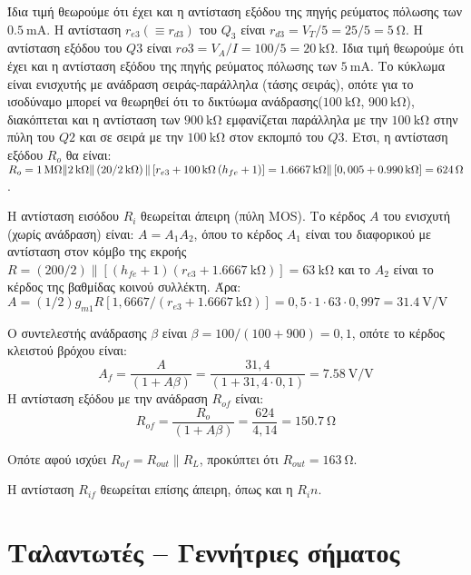\documentclass[11pt,a4paper,titlepage,fleqn]{article}
\begin{document}
	Ίδια τιμή θεωρούμε ότι έχει και η αντίσταση εξόδου της πηγής ρεύματος πόλωσης των $\SI{0,5}{\milli\ampere}$. Η αντίσταση $r_{e3} (\equiv r_{d3})$ του $Q_3$ είναι $r_{d3} = V_T / 5 = 25/5 = \SI{5}{\ohm}$. Η αντίσταση εξόδου του $Q3$ είναι $r{o3} =V_A/I = 100/5= \SI{20}{\kilo\ohm}$.
	Ιδια τιμή θεωρούμε ότι έχει και
η αντίσταση εξόδου της πηγής ρεύματος πόλωσης των $\SI{5}{\milli\ampere}$. Το κύκλωμα είναι ενισχυτής με ανάδραση σειράς-παράλληλα (τάσης σειράς), οπότε για το
ισοδύναμο μπορεί να θεωρηθεί ότι το δικτύωμα ανάδρασης($\SI{100}{\kilo\ohm}$, $\SI{900}{\kilo\ohm}$), διακόπτεται και η αντίσταση των $\SI{900}{\kilo\ohm}$ εμφανίζεται παράλληλα με την $\SI{100}{\kilo\ohm}$ στην πύλη του $Q2$ και
σε σειρά με την $\SI{100}{\kilo\ohm}$ στον εκπομπό του $Q3$. Ετσι, η αντίσταση εξόδου $R_o$ θα είναι: 
	$R_o = \SI{1}{\mega\ohm} \| \SI{2}{\kilo\ohm} \| \left( \SI[parse-numbers=false]{20/2}{\kilo\ohm} \right) \| \left[r_{e3} + \SI{100}{\kilo\ohm} \left(h_{fe} + 1\right)\right] = \SI{1,6667}{\kilo\ohm} \| \left[0,005 + \SI{0,990}{\kilo\ohm}\right] = \SI{624}{\ohm}$.
	
	Η αντίσταση εισόδου $R_i$ θεωρείται άπειρη (πύλη MOS). Το κέρδος $A$ του ενισχυτή (χωρίς ανάδραση) είναι: $A= A_1 A_2$, όπου το κέρδος $A_1$ είναι του διαφορικού με αντίσταση στον κόμβο της εκροής $R= \left(200/2\right) \| \left[\left(h_{fe} +1\right) \left(r_{e3} + \SI{1,6667}{\kilo\ohm}\right)\right] = \SI{63}{\kilo\ohm}$ και το $A_2$ είναι το κέρδος της βαθμίδας κοινού συλλέκτη. Άρα: $A=\left(1/2\right) g_{m1} R\left[1,6667 / \left( r_{e3} +\SI{1,6667}{\kilo\ohm}\right)\right] = 0,5\cdot 1\cdot 63 \cdot 0,997 = \SI[per-mode=symbol]{31,4}{\volt\per\volt}$
	
	Ο συντελεστής ανάδρασης $\beta$ είναι $\beta= 100/ \left(100+900\right) = 0,1$, οπότε το κέρδος κλειστού βρόχου είναι: \[A_f=\frac{A}{\left(1+A\beta\right)} = \frac{31,4}{\left(1+31,4\cdot 0,1\right)} = \SI[per-mode=symbol]{7,58}{\volt\per\volt}\]
	Η αντίσταση εξόδου με την ανάδραση $R_{of}$ είναι:
	\[R_{of}= \frac{R_{o} }{\left(1+A\beta\right)}=\frac{624}{4,14} = \SI{150,7}{\ohm}\]
	
	Οπότε αφού ισχύει $R_{of} = R_{out} \| R_L $, προκύπτει ότι
$R_{out} =\SI{163}{\ohm}$.
	
	Η αντίσταση $R_{if}$ θεωρείται επίσης άπειρη, όπως και η $R_in$.
	


\section{Ταλαντωτές – Γεννήτριες σήματος}
\end{document}
